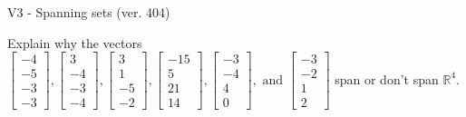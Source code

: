 \begin{exercise}
  \begin{exerciseTitle}V3 - Spanning sets (ver. 404)\end{exerciseTitle}
  \begin{exerciseStatement}
    Explain why the vectors \(\left[\begin{array}{r}
-4 \\
-5 \\
-3 \\
-3
\end{array}\right] , \left[\begin{array}{r}
3 \\
-4 \\
-3 \\
-4
\end{array}\right] , \left[\begin{array}{r}
3 \\
1 \\
-5 \\
-2
\end{array}\right] , \left[\begin{array}{r}
-15 \\
5 \\
21 \\
14
\end{array}\right] , \left[\begin{array}{r}
-3 \\
-4 \\
4 \\
0
\end{array}\right] , \text{ and } \left[\begin{array}{r}
-3 \\
-2 \\
1 \\
2
\end{array}\right]\) span or don't span \(\mathbb{R}^4\). 
	



\end{exerciseStatement}
\end{exercise}
